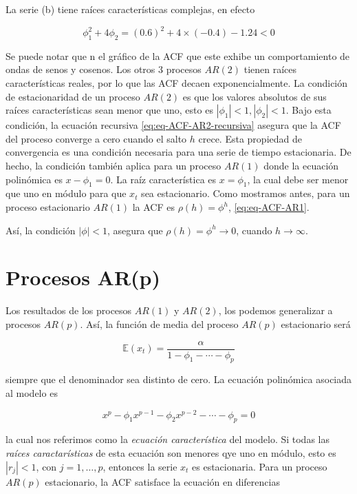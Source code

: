 \documentclass[12pt,]{krantz}
\theoremstyle{definition}
\theoremstyle{definition}
\theoremstyle{definition}
\theoremstyle{remark}
\begin{document}
La serie (b) tiene raíces características complejas, en efecto

\[\phi_1^2+4\phi_2=(0.6)^2+4\times(-0.4)-1.24<0\]

Se puede notar que n el gráfico de la ACF que este exhibe un
comportamiento de ondas de senos y cosenos. Los otros 3 procesos
\(AR(2)\) tienen raíces características reales, por lo que las ACF
decaen exponencialmente. La condición de estacionaridad de un proceso
\(AR(2)\) es que los valores absolutos de sus raíces características
sean menor que uno, esto es \(|\phi_1|<1, |\phi_2|<1\). Bajo esta
condición, la ecuación recursiva \eqref{eq:eq-ACF-AR2-recursiva} asegura
que la ACF del proceso converge a cero cuando el salto \(h\) crece. Esta
propiedad de convergencia es una condición necesaria para una serie de
tiempo estacionaria. De hecho, la condición también aplica para un
proceso \(AR(1)\) donde la ecuación polinómica es \(x-\phi_1=0\). La
raíz característica es \(x=\phi_1\), la cual debe ser menor que uno en
módulo para que \(x_t\) sea estacionario. Como mostramos antes, para un
proceso estacionario \(AR(1)\) la ACF es \(\rho(h)=\phi^h\),
\eqref{eq:eq-ACF-AR1}.

Así, la condición \(|\phi|<1\), asegura que \(\rho(h)=\phi^h\to0\),
cuando \(h\to\infty\).

\section{Procesos AR(p)}\label{procesos-arp}

Los resultados de los procesos \(AR(1)\) y \(AR(2)\), los podemos
generalizar a procesos \(AR(p)\). Así, la función de media del proceso
\(AR(p)\) estacionario será

\begin{equation}
\mathbb{E}(x_t) = \frac{\alpha}{1-\phi_1-\cdots-\phi_p}
\label{eq:eq-funcion-media-ARp}
\end{equation}

siempre que el denominador sea distinto de cero. La ecuación polinómica
asociada al modelo es

\begin{equation}
x^p-\phi_1x^{p-1}-\phi_2x^{p-2}-\cdots-\phi_p=0
\label{eq:eq-polinomio-ARp}
\end{equation}

la cual nos referimos como la \emph{ecuación característica} del modelo.
Si todas las \emph{raíces caractarísticas} de esta ecuación son menores
qye uno en módulo, esto es \(|r_j|<1\), con \(j=1,\ldots,p\), entonces
la serie \(x_t\) es estacionaria. Para un proceso \(AR(p)\)
estacionario, la ACF satisface la ecuación en diferencias
\end{document}
